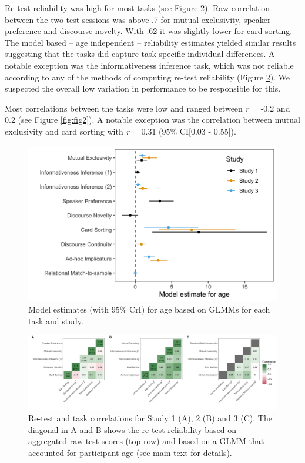 \documentclass[
  man,floatsintext]{apa6}
\begin{document}
Re-test reliability was high for most tasks (see Figure \ref{fig:fig4}). Raw correlation between the two test sessions was above .7 for mutual exclusivity, speaker preference and discourse novelty. With .62 it was slightly lower for card sorting. The model based -- age independent -- reliability estimates yielded similar results suggesting that the tasks did capture task specific individual differences. A notable exception was the informativeness inference task, which was not reliable according to any of the methods of computing re-test reliability (Figure \ref{fig:fig4}). We suspected the overall low variation in performance to be responsible for this.

Most correlations between the tasks were low and ranged between \emph{r} = -0.2 and 0.2 (see Figure \ref{fig:fig2}). A notable exception was the correlation between mutual exclusivity and card sorting with \emph{r} = 0.31 (95\% CI{[}0.03 - 0.55{]}).



\begin{figure}

{\centering \includegraphics[width=0.6\linewidth]{./figures/figure3} 

}

\caption{Model estimates (with 95\% CrI) for age based on GLMMs for each task and study.}\label{fig:fig3}
\end{figure}



\begin{figure}

{\centering \includegraphics[width=1\linewidth]{./figures/figure4} 

}

\caption{Re-test and task correlations for Study 1 (A), 2 (B) and 3 (C). The diagonal in A and B shows the re-test reliability based on aggregated raw test scores (top row) and based on a GLMM that accounted for participant age (see main text for details).}\label{fig:fig4}
\end{figure}
\end{document}
